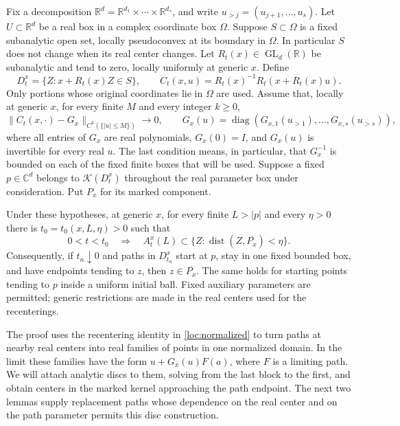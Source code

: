 Fix a decomposition $\mathbb R^d=\mathbb R^{d_1}\times\cdots
\times\mathbb R^{d_s}$, and write $u_{>j}=(u_{j+1},\ldots,u_s)$.
Let $U\subset\mathbb R^d$ be a real box in a complex coordinate box
$\Omega$.  Suppose $S\subset\Omega$ is a fixed subanalytic open set,
locally pseudoconvex at its boundary in $\Omega$.  In particular $S$
does not change when its real center changes.  Let
$R_t(x)\in\operatorname{GL}_d(\mathbb R)$ be subanalytic and tend to zero,
locally uniformly at generic $x$.  Define
\begin{equation}\label{loc:normalized}
 D_t^x=\{Z:x+R_t(x)Z\in S\},\qquad
 C_t(x,u)=R_t(x)^{-1}R_t(x+R_t(x)u).
\end{equation}
Only portions whose original coordinates lie in $\Omega$ are used.
Assume that, locally at generic $x$, for every finite $M$ and every
integer $k\geq0$,
\begin{equation}\label{loc:ratio}
 \|C_t(x,\cdot)-G_x\|_{C^k(\{|u|\leq M\})}\longrightarrow0,
 \qquad
 G_x(u)=\operatorname{diag}
       (G_{x,1}(u_{>1}),\ldots,G_{x,s}(u_{>s})),
\end{equation}
where all entries of $G_x$ are real polynomials,
$G_x(0)=I$, and $G_x(u)$ is invertible for every real $u$.
The last condition means, in particular, that $G_x^{-1}$ is bounded
on each of the fixed finite boxes that will be used.  Suppose a fixed
$p\in\mathbb C^d$ belongs to $\mathcal K(D_t^x)$ throughout the real
parameter box under consideration.  Put $P_x$ for its marked component.

\begin{theorem}\label{loc:theorem}
Under these hypotheses, at generic $x$, for every finite $L>|p|$ and
every $\eta>0$ there is $t_0=t_0(x,L,\eta)>0$ such that
\begin{equation}\label{loc:upper}
 0<t<t_0\quad\Longrightarrow\quad
 A_t^x(L)\subset\{Z:\operatorname{dist}(Z,\overline{P_x})<\eta\}.
\end{equation}
Consequently, if $t_n\downarrow0$ and paths in $D_{t_n}^x$ start at
$p$, stay in one fixed bounded box, and have endpoints tending to $z$,
then $z\in\overline{P_x}$.  The same holds for starting points tending
to $p$ inside a uniform initial ball.  Fixed auxiliary parameters are
permitted; generic restrictions are made in the real centers used for
the recenterings.
\end{theorem}

The proof uses the recentering identity in \eqref{loc:normalized}
to turn paths at nearby real centers into real families of points
in one normalized domain.  In the limit these families have the
form $u+G_x(u)F(a)$, where $F$ is a limiting path.  We will attach
analytic discs to them, solving from the last block to the first,
and obtain centers in the marked kernel approaching the path
endpoint.  The next two lemmas supply replacement paths whose
dependence on the real center and on the path parameter permits
this disc construction.


